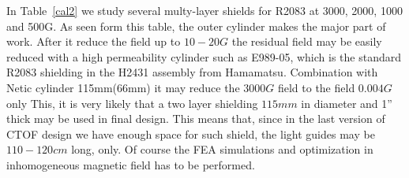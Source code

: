 \documentclass[12pt]{article}
\begin{document}
In Table~\ref{cal2} we study several multy-layer shields for R2083 at 3000, 2000, 1000 and 500G.
As seen form  this table,  the outer cylinder makes the major part of work. 
After it reduce the field up to $10-20G$
the residual field may be easily reduced with a high permeability cylinder such as E989-05, which is
the standard R2083 shielding in the H2431 assembly  from Hamamatsu.
Combination with Netic cylinder  115mm(66mm) it may reduce the $3000G$ field to the field $0.004G$ only
This, it is very likely that a two layer shielding $115mm$ in diameter and 1'' thick  may be used in final design.
This means that, since in the last version of CTOF design we have enough space for such shield,
 the light guides may be $110-120cm$ long, only.
Of course  the FEA simulations and optimization  in inhomogeneous magnetic field has to be performed.
\end{document}
